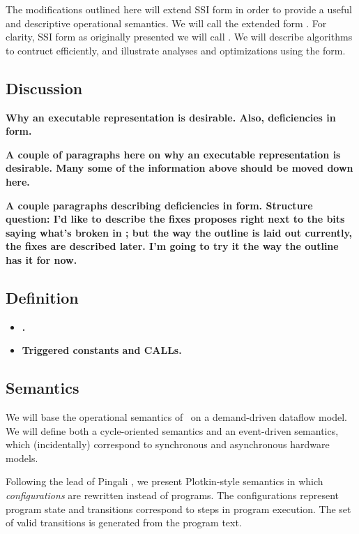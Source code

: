 \documentclass[12pt,titlepage]{article}
\begin{document}
The modifications outlined here will extend SSI form in order to
provide a useful and descriptive operational semantics.  We will call
the extended form \ssiplus.  For clarity, SSI form as originally
presented we will call \ssizero.  We will describe algorithms to
contruct \ssiplus{} efficiently, and illustrate analyses and
optimizations using the form.

\subsection{Discussion}
\textbf{Why an executable representation is desirable.  Also,
deficiencies in \ssizero{} form.}

\textbf{A couple of paragraphs here on why an executable
representation is desirable.  Many some of the information above
should be moved down here.}

\textbf{A couple paragraphs describing deficiencies in \ssizero{} form.
Structure question: I'd like to describe the fixes \ssiplus{} proposes
right next to the bits saying what's broken in \ssizero{}; but the way
the outline is laid out currently, the fixes are described later.  I'm
going to try it the way the outline has it for now.}

\subsection{Definition}
\begin{itemize}
\item \textbf{.}
\item \textbf{Triggered constants and CALLs.}
\end{itemize}

\subsection{Semantics}\label{sec:semantics}
We will base the operational semantics of \ssiplus\ on a demand-driven
dataflow model.  We will define both a cycle-oriented semantics and an
event-driven semantics, which (incidentally) correspond to synchronous
and asynchronous hardware models.

Following the lead of Pingali \cite{pingali90:dfg}, we present Plotkin-style
semantics \cite{plotkin81:opsem} in which \emph{configurations} are
rewritten instead of programs.  The configurations represent program
state and transitions correspond to steps in program execution.  The
set of valid transitions is generated from the program text.
\end{document}
